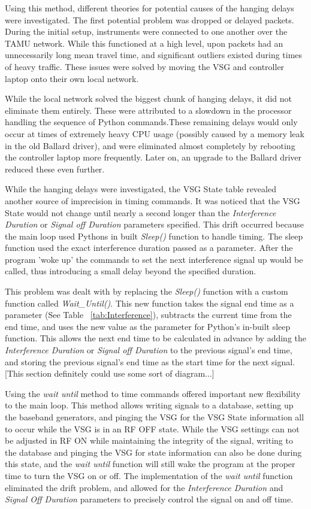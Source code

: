 Using this method, different theories for potential causes of the hanging delays were investigated. The first potential problem was dropped or delayed packets. During the initial setup, instruments were connected to one another over the TAMU network. While this functioned at a high level, upon packets had an unnecessarily long mean travel time, and significant outliers existed during times of heavy traffic. These issues were solved by moving the VSG and controller laptop onto their own local network. 

 While the local network solved the biggest chunk of hanging delays, it did not eliminate them entirely. These were attributed to a slowdown in the processor handling the sequence of Python commands.These remaining delays would only occur at times of extremely heavy CPU usage (possibly caused by a memory leak in the old Ballard driver), and were eliminated almost completely by rebooting the controller laptop more frequently. Later on, an upgrade to the Ballard driver reduced these even further. 
 
 While the hanging delays were investigated, the VSG State table revealed another source of imprecision in timing commands. It was noticed that the VSG State would not change until nearly a second longer than the \textit{Interference Duration} or \textit{Signal off Duration} parameters specified. This drift occurred because the main loop used Pythons in built \textit{Sleep()} function to handle timing. The sleep function used the exact interference duration passed as a parameter. After the program 'woke up' the commands to set the next interference signal up would be called, thus introducing a small delay beyond the specified duration. 
 
 This problem was dealt with by replacing the \textit{Sleep()} function with a custom function called \textit{Wait\_Until()}. This new function takes the signal end time as a parameter (See Table ~\ref{tab:Interference}), subtracts the current time from the end time, and uses the new value as the parameter for Python's in-built sleep function. This allows the next end time to be calculated in advance by adding the \textit{Interference Duration} or \textit{Signal off Duration} to the previous signal's end time, and storing the previous signal's end time as the start time for the next signal. [This section definitely could use some sort of diagram...]

Using the \textit{wait until} method to time commands offered important new flexibility to the main loop. This method allows writing signals to a database, setting up the baseband generators, and pinging the VSG for the VSG State information all to occur while the VSG is in an RF OFF state. While the VSG settings can not be adjusted in RF ON while maintaining the integrity of the signal, writing to the database and pinging the VSG for state information can also be done during this state, and the \textit{wait until} function will still wake the program at the proper time to turn the VSG on or off. The implementation of the \textit{wait until} function eliminated the drift problem, and allowed for the \textit{Interference Duration} and \textit{Signal Off Duration} parameters to precisely control the signal on and off time. 

